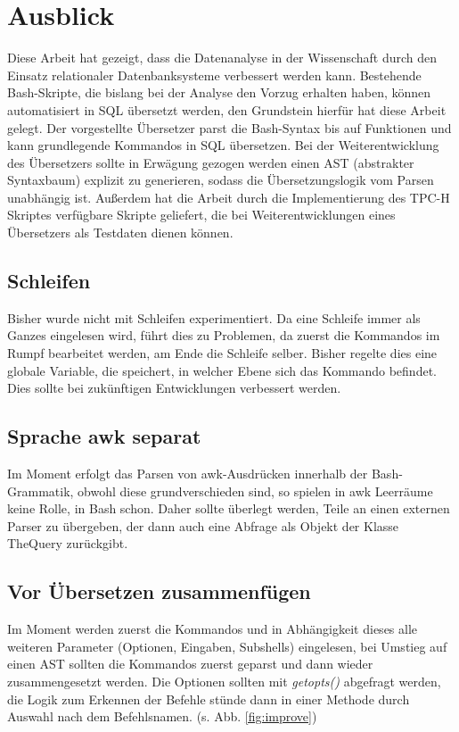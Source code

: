 \chapter{Ausblick}
Diese Arbeit hat gezeigt, dass die Datenanalyse in der Wissenschaft durch den Einsatz relationaler Datenbanksysteme verbessert werden kann. Bestehende Bash-Skripte, die bislang bei der Analyse den Vorzug erhalten haben, können automatisiert in SQL übersetzt werden, den Grundstein hierfür hat diese Arbeit gelegt.
Der vorgestellte Übersetzer parst die Bash-Syntax bis auf Funktionen und kann grundlegende Kommandos in SQL übersetzen. Bei der Weiterentwicklung des Übersetzers sollte in Erwägung gezogen werden einen AST (abstrakter Syntaxbaum) explizit zu generieren, sodass die Übersetzungslogik vom Parsen unabhängig ist.
Außerdem hat die Arbeit durch die Implementierung des TPC-H Skriptes verfügbare Skripte geliefert, die bei Weiterentwicklungen eines Übersetzers als Testdaten dienen können.
\section{Schleifen}
Bisher wurde nicht mit Schleifen experimentiert. Da eine Schleife immer als Ganzes eingelesen wird, führt dies zu Problemen, da zuerst die Kommandos im Rumpf bearbeitet werden, am Ende die Schleife selber. Bisher regelte dies eine globale Variable, die speichert, in welcher Ebene sich das Kommando befindet. Dies sollte bei zukünftigen Entwicklungen verbessert werden.

\section{Sprache awk separat}
Im Moment erfolgt das Parsen von awk-Ausdrücken innerhalb der Bash-Grammatik, obwohl diese grundverschieden sind, so spielen in awk Leerräume keine Rolle, in Bash schon. Daher sollte überlegt werden, Teile an einen externen Parser zu übergeben, der dann auch eine Abfrage als Objekt der Klasse TheQuery zurückgibt.

\section{Vor Übersetzen zusammenfügen}
Im Moment werden zuerst die Kommandos und in Abhängigkeit dieses alle weiteren Parameter (Optionen, Eingaben, Subshells) eingelesen, bei Umstieg auf einen AST sollten die Kommandos zuerst geparst und dann wieder zusammengesetzt werden. Die Optionen sollten mit \textit{getopts()} abgefragt werden, die Logik zum Erkennen der Befehle stünde dann in einer Methode durch Auswahl nach dem Befehlsnamen. (s. Abb. \ref{fig:improve})

